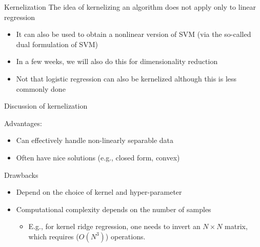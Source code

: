 \begin{parag}{Kernelization}
    The idea of kernelizing an algorithm does not apply only to linear regression 
	\begin{itemize}
	    \item It can also be used to obtain a nonlinear version of SVM (via the so-called dual formulation of SVM)
	    \item In a few weeks, we will also do this for dimensionality reduction
	    \item Not that logistic regression can also be kernelized although this is less commonly done
	\end{itemize}
	
\end{parag}

\begin{parag}{Discussion of kernelization}
    \begin{subparag}{Advantages}:
		\begin{itemize}
		    \item Can effectively handle non-linearly separable data
		    \item Often have nice solutions (e.g., closed form, convex)
		\end{itemize}
    \end{subparag}
	\begin{subparag}{Drawbacks}
	    \begin{itemize}
	        \item Depend on the choice of kernel and hyper-parameter
	        \item Computational complexity depends on the number of samples 
				\begin{itemize}
				    \item E.g., for kernel ridge regression, one needs to invert an $N \times N$ matrix, which requires ($O\left(N^3\right)$) operations.
				\end{itemize}
	    \end{itemize}
	    
	\end{subparag}
\end{parag}

